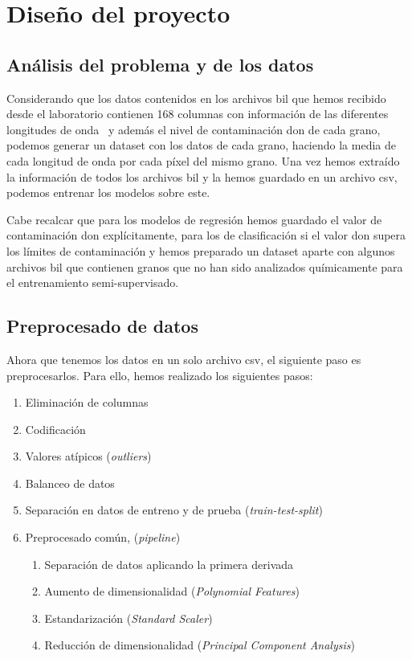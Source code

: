 \section{Diseño del proyecto}

\subsection{Análisis del problema y de los datos}\label{sec:obtencion}

Considerando que los datos contenidos en los archivos \gls{bil} que hemos recibido desde el laboratorio contienen 168 columnas con información de las diferentes longitudes de onda\ \cite{WhatIsHy18:online} y además el nivel de contaminación \gls{don} de cada grano, podemos generar un \gls{dataset} con los datos de cada grano, haciendo la media de cada longitud de onda por cada píxel del mismo grano. Una vez hemos extraído la información de todos los archivos \gls{bil} y la hemos guardado en un archivo \acrshort{csv}, podemos entrenar los modelos sobre este.

Cabe recalcar que para los modelos de regresión hemos guardado el valor de contaminación \gls{don} explícitamente, para los de clasificación si el valor \gls{don} supera los límites de contaminación y hemos preparado un \gls{dataset} aparte con algunos archivos \gls{bil} que contienen granos que no han sido analizados químicamente para el entrenamiento semi-supervisado.


\subsection{Preprocesado de datos}\label{sec:preprocesado}

Ahora que tenemos los datos en un solo archivo \acrshort{csv}, el siguiente paso es preprocesarlos. Para ello, hemos realizado los siguientes pasos: 

\begin{enumerate}
    \item Eliminación de columnas
    \item Codificación
    \item Valores atípicos (\textit{outliers})
    \item Balanceo de datos
    \item Separación en datos de entreno y de prueba (\textit{train-test-split})
    \item Preprocesado común, (\textit{pipeline})
    \begin{enumerate}
        \item Separación de datos aplicando la primera derivada 
        \item Aumento de dimensionalidad (\textit{Polynomial Features})
        \item Estandarización  (\textit{Standard Scaler})
        \item Reducción de dimensionalidad (\textit{Principal Component Analysis})
    \end{enumerate}
    
\end{enumerate}


